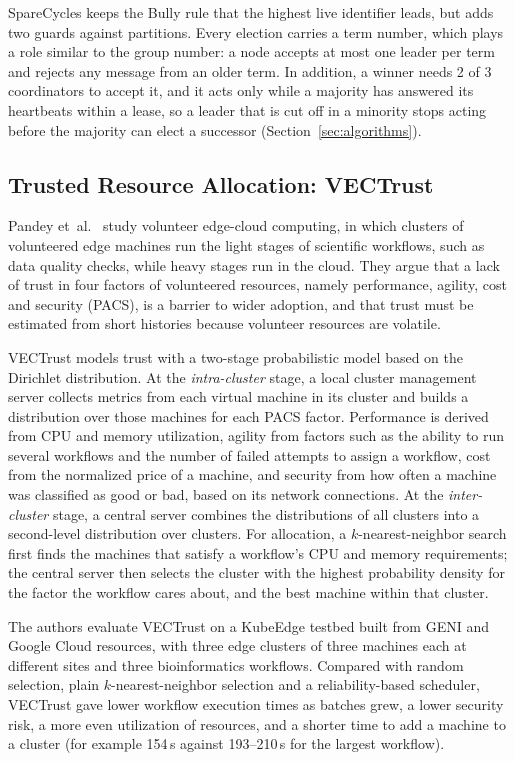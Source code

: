 SpareCycles keeps the Bully rule that the highest live identifier leads, but adds two guards against partitions. Every election carries a term number, which plays a role similar to the group number: a node accepts at most one leader per term and rejects any message from an older term. In addition, a winner needs 2 of 3 coordinators to accept it, and it acts only while a majority has answered its heartbeats within a lease, so a leader that is cut off in a minority stops acting before the majority can elect a successor (Section~\ref{sec:algorithms}).

\subsection{Trusted Resource Allocation: VECTrust}
Pandey et~al.~\cite{pandey2021vectrust} study volunteer edge-cloud computing, in which clusters of volunteered edge machines run the light stages of scientific workflows, such as data quality checks, while heavy stages run in the cloud. They argue that a lack of trust in four factors of volunteered resources, namely performance, agility, cost and security (PACS), is a barrier to wider adoption, and that trust must be estimated from short histories because volunteer resources are volatile.

VECTrust models trust with a two-stage probabilistic model based on the Dirichlet distribution. At the \emph{intra-cluster} stage, a local cluster management server collects metrics from each virtual machine in its cluster and builds a distribution over those machines for each PACS factor. Performance is derived from CPU and memory utilization, agility from factors such as the ability to run several workflows and the number of failed attempts to assign a workflow, cost from the normalized price of a machine, and security from how often a machine was classified as good or bad, based on its network connections. At the \emph{inter-cluster} stage, a central server combines the distributions of all clusters into a second-level distribution over clusters. For allocation, a $k$-nearest-neighbor search first finds the machines that satisfy a workflow's CPU and memory requirements; the central server then selects the cluster with the highest probability density for the factor the workflow cares about, and the best machine within that cluster.

The authors evaluate VECTrust on a KubeEdge testbed built from GENI and Google Cloud resources, with three edge clusters of three machines each at different sites and three bioinformatics workflows. Compared with random selection, plain $k$-nearest-neighbor selection and a reliability-based scheduler, VECTrust gave lower workflow execution times as batches grew, a lower security risk, a more even utilization of resources, and a shorter time to add a machine to a cluster (for example 154\,s against 193--210\,s for the largest workflow).

